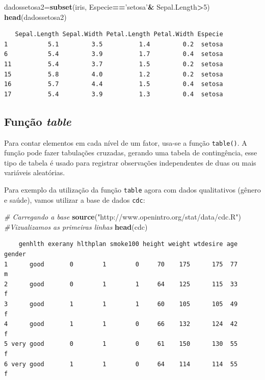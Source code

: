\documentclass[12pt,brazil,oneside]{book}
\newenvironment{Shaded}{\begin{snugshade}}{\end{snugshade}}
\newcommand{\CommentTok}[1]{\textcolor[rgb]{0.56,0.35,0.01}{\textit{#1}}}
\newcommand{\DecValTok}[1]{\textcolor[rgb]{0.00,0.00,0.81}{#1}}
\newcommand{\KeywordTok}[1]{\textcolor[rgb]{0.13,0.29,0.53}{\textbf{#1}}}
\newcommand{\NormalTok}[1]{#1}
\newcommand{\OperatorTok}[1]{\textcolor[rgb]{0.81,0.36,0.00}{\textbf{#1}}}
\newcommand{\StringTok}[1]{\textcolor[rgb]{0.31,0.60,0.02}{#1}}
\begin{document}
\begin{Shaded}
\begin{Highlighting}[]
\NormalTok{dadossetosa2=}\KeywordTok{subset}\NormalTok{(iris, Especie}\OperatorTok{==}\StringTok{'setosa'}\OperatorTok{&}\StringTok{ }\NormalTok{Sepal.Length}\OperatorTok{>}\DecValTok{5}\NormalTok{)}
\KeywordTok{head}\NormalTok{(dadossetosa2)}
\end{Highlighting}
\end{Shaded}

\begin{verbatim}
   Sepal.Length Sepal.Width Petal.Length Petal.Width Especie
1           5.1         3.5          1.4         0.2  setosa
6           5.4         3.9          1.7         0.4  setosa
11          5.4         3.7          1.5         0.2  setosa
15          5.8         4.0          1.2         0.2  setosa
16          5.7         4.4          1.5         0.4  setosa
17          5.4         3.9          1.3         0.4  setosa
\end{verbatim}

\hypertarget{funcao-table}{%
\subsection{\texorpdfstring{Função \emph{table}}{Função table}}\label{funcao-table}}

Para contar elementos em cada nível de um fator, usa-se a função \texttt{table()}. A função pode fazer tabulações cruzadas, gerando uma tabela de contingência, esse tipo de tabela é usado para registrar observações independentes de duas ou mais variáveis aleatórias.

Para exemplo da utilização da função \texttt{table} agora com dados qualitativos (gênero e saúde), vamos utilizar a base de dados \texttt{cdc}:

\begin{Shaded}
\begin{Highlighting}[]
\CommentTok{# Carregando a base}
\KeywordTok{source}\NormalTok{(}\StringTok{"http://www.openintro.org/stat/data/cdc.R"}\NormalTok{)}
\CommentTok{#Vizualizamos as primeiras linhas}
\KeywordTok{head}\NormalTok{(cdc)}
\end{Highlighting}
\end{Shaded}

\begin{verbatim}
    genhlth exerany hlthplan smoke100 height weight wtdesire age gender
1      good       0        1        0     70    175      175  77      m
2      good       0        1        1     64    125      115  33      f
3      good       1        1        1     60    105      105  49      f
4      good       1        1        0     66    132      124  42      f
5 very good       0        1        0     61    150      130  55      f
6 very good       1        1        0     64    114      114  55      f
\end{verbatim}
\end{document}
